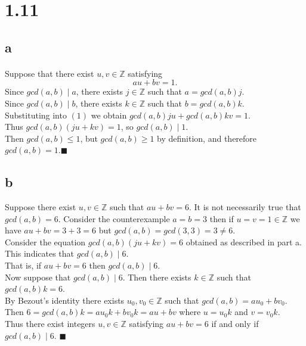 \documentclass[letterpaper,12pt,oneside,onecolumn]{report}
\begin{document}
\section*{1.11}
\subsection*{a}
\paragraph{}
Suppose that there exist $u, v \in \mathbb{Z}$ satisfying 
\begin{equation}
au + bv = 1.
\end{equation}
Since $gcd(a,b) \mid a$, there exists $j \in \mathbb{Z}$ such that $a = gcd(a,b)j.$\\
Since $gcd(a,b) \mid b$, there exists $k \in \mathbb{Z}$ such that $b = gcd(a,b)k.$\\
Substituting into $(1)$ we obtain $gcd(a,b)ju + gcd(a,b)kv = 1$.\\
Thus $gcd(a,b)(ju + kv) = 1$, so $gcd(a,b) \mid 1$.\\
Then $gcd(a,b) \leq 1$, but $gcd(a,b) \geq 1$ by definition, and therefore $gcd(a,b) = 1$.$\blacksquare$
\subsection*{b}
Suppose there exist $u,v \in \mathbb{Z}$ such that $au+bv=6$. It is not necessarily true that $gcd(a,b)=6$. Consider the counterexample $a=b=3$ then if $u=v=1 \in \mathbb{Z}$ we have $au + bv = 3+3 = 6$ but $gcd(a,b) = gcd(3,3) = 3 \neq 6$.\\
Consider the equation $gcd(a,b)(ju + kv) = 6$ obtained as described in part a. This indicates that $gcd(a,b) \mid 6$.\\
That is, if $au + bv = 6$ then $gcd(a,b) \mid 6$.\\
Now suppose that $gcd(a,b) \mid 6$. Then there exists $k \in \mathbb{Z}$ such that $gcd(a,b)k = 6$.\\
By Bezout's identity there exists $u_0, v_0 \in \mathbb{Z}$ such that $gcd(a,b) = au_0 + bv_0$.\\
Then $6 = gcd(a,b)k = au_0k + bv_0k = au+bv$ where $u = u_0k$ and $v = v_0k$.\\
Thus there exist integers $u,v \in \mathbb{Z}$ satisfying $au + bv = 6$ if and only if $gcd(a,b) \mid 6$. $\blacksquare$
\end{document}
